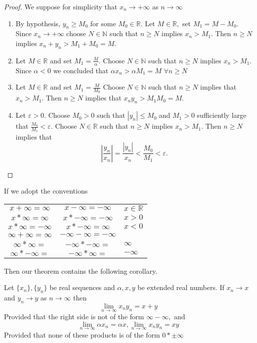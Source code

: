 \begin{proof}
We suppose for simplicity that $x_n \to +\infty$ as $n \to \infty$
\begin{enumerate}
\item By hypothesis, $y_n \geq M_0$ for some $M_0 \in \mathbb{R}.$ Let $M \in \mathbb{R},$ set $M_1 = M-M_0.$ Since $x_n \to +\infty$ choose $N \in \mathbb{N}$ such that $n \geq N$ implies $x_n > M_1.$ Then $n \geq N$ implies $x_n + y_n > M_1 + M_0 = M.$
\item Let $M \in \mathbb{R}$ and set $M_1 = \frac{M}{\alpha}.$ Choose $N \in \mathbb{N}$ such that $n \geq N$ implies $x_n > M_1.$ Since $\alpha < 0$ we concluded that $\alpha x_n > \alpha M_1 = M$ $\forall n \geq N$
\item Let $M \in \mathbb{R}$ and set $M_1 = \frac{M}{M_0}$ Choose $N \in \mathbb{N}$ such that $n \geq N$ implies that $x_n > M_1.$ Then $n \geq N$ implies that $x_n y_n > M_1 M_0 = M.$
\item Let $\varepsilon > 0.$ Choose $M_0 > 0$ such that $|y_n| \leq M_0$ and $M_1 > 0$ sufficiently large that $\frac{M_0}{M_1} < \varepsilon.$ Choose $N \in \mathbb{R}$ such that $n \geq N$ implies $x_n > M_1.$ Then $n \geq N$ implies that $$|\frac{y_n}{x_n}| = \frac{|y_n|}{x_n} < \frac{M_0}{M_1} < \varepsilon.$$
\end{enumerate}
\end{proof}

If we adopt the conventions
\begin{center}
\begin{tabular}{c c l
}
$x+\infty=\infty$ & $x-\infty=-\infty$ & $x \in \mathbb{R}$\\
$x * \infty = \infty$ & $x * -\infty = -\infty$ & $x > 0$ \\
$x * \infty = -\infty$ & $x * -\infty = \infty$ & $x < 0$ \\
$\infty + \infty = \infty$ & $-\infty - \infty = -\infty$ & \\
$\infty * \infty =$ & $-\infty * -\infty =$ & $\infty$ \\
$\infty * -\infty =$ & $-\infty *\infty =$	& $-\infty$ \\ 
\end{tabular}
\end{center}

Then our theorem contains the following corollary.
\begin{corollary}
Let $\{x_n\},\{y_n\}$ be real sequences and $\alpha, x, y$ be extended real numbers. If $x_n \to x$ and $y_n \to y$ as $n \to \infty$ then $$\lim_{n \to \infty} x_n y_n = x + y$$ Provided that the right side is not of the form $\infty - \infty, $ and $$\lim_{n \to \infty} \alpha x_n = \alpha x, \lim_{n \to \infty} x_n y_n = xy$$ Provided that none of these products is of the form $0 * \pm \infty$
\end{corollary}

